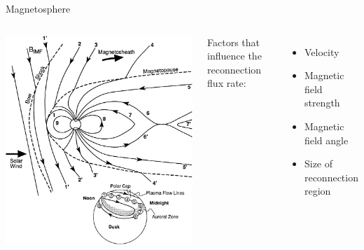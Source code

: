 \begin{frame}[plain,c]{Magnetosphere}{}
	\begin{columns}[c]
		
		\includegraphics[width=\textwidth]{../figures_of_others/images/Kivelson1995_fig9_11_dungey_cycle.png}
		
		
		Factors that influence the reconnection flux rate:
		\begin{itemize}
			\item Velocity
			\item Magnetic field strength
			\item Magnetic field angle
			\item Size of reconnection region
		\end{itemize}
		
	\end{columns}
\end{frame}
